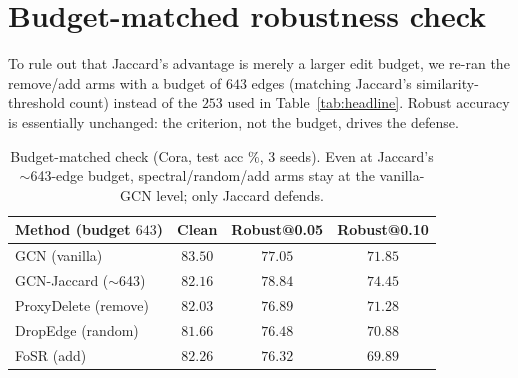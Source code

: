 \documentclass[10pt]{article}
\begin{document}
\section{Budget-matched robustness check}
To rule out that Jaccard's advantage is merely a larger edit budget, we re-ran the remove/add arms with a
budget of $643$ edges (matching Jaccard's similarity-threshold count) instead of the $253$ used in
Table~\ref{tab:headline}. Robust accuracy is essentially unchanged: the criterion, not the budget, drives
the defense.

\begin{table}[h]
\centering\small
\begin{tabular}{@{}lccc@{}}
\toprule
\textbf{Method (budget $643$)} & \textbf{Clean} & \textbf{Robust@0.05} & \textbf{Robust@0.10} \\
\midrule
GCN (vanilla)        & $83.50$ & $77.05$ & $71.85$ \\
GCN-Jaccard ($\sim$643) & $82.16$ & $\mathbf{78.84}$ & $\mathbf{74.45}$ \\
ProxyDelete (remove) & $82.03$ & $76.89$ & $71.28$ \\
DropEdge (random)    & $81.66$ & $76.48$ & $70.88$ \\
FoSR (add)           & $82.26$ & $76.32$ & $69.89$ \\
\bottomrule
\end{tabular}
\caption{Budget-matched check (Cora, test acc \%, 3 seeds). Even at Jaccard's $\sim$643-edge budget,
spectral/random/add arms stay at the vanilla-GCN level; only Jaccard defends.}
\end{table}
\end{document}

